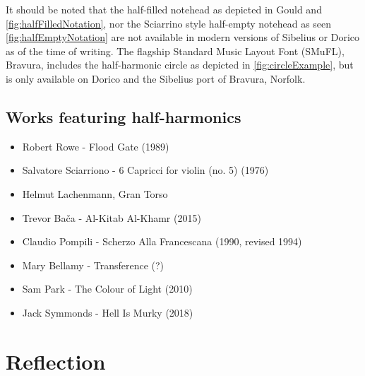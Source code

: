 




It should be noted that the half-filled notehead as depicted in Gould and \autoref{fig:halfFilledNotation}, nor the Sciarrino style half-empty notehead as seen \autoref{fig:halfEmptyNotation} are not available in modern versions of Sibelius or Dorico as of the time of writing.\autocite[424]{gouldBars2011}
The flagship Standard Music Layout Font (SMuFL), Bravura, includes the half-harmonic circle as depicted in \autoref{fig:circleExample}, but is only available on Dorico and the Sibelius port of Bravura, Norfolk.\autocite[]{w3ccommitteeStandardMusicFont2019}

\subsection{Works featuring half-harmonics} \label{sec:half-harmonicsLiterature}

\begin{itemize}
    \item Robert Rowe - Flood Gate (1989)
    \item Salvatore Sciarriono - 6 Capricci for violin (no. 5) (1976) 
    \item Helmut Lachenmann, Gran Torso
    \item Trevor Bača - Al-Kitab Al-Khamr (2015)
    \item Claudio Pompili - Scherzo Alla Francescana (1990, revised 1994)
    \item Mary Bellamy - Transference (?)
    \item Sam Park - The Colour of Light (2010)
    \item Jack Symmonds - Hell Is Murky (2018)
\end{itemize}

\section{Reflection}




\lipsum[4]
